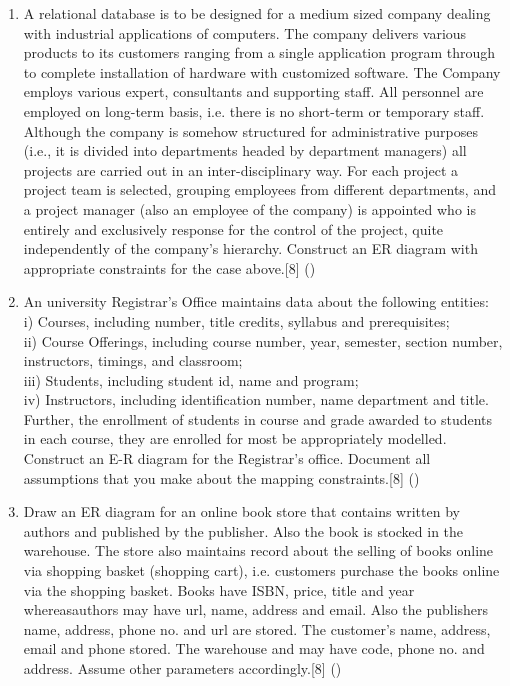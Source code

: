 \documentclass[12pt]{article}
\begin{document}
\begin{enumerate}
    \item A relational database is to be designed for a medium sized company dealing with industrial applications of computers. The company delivers various products to its customers ranging from a single application program through to complete installation of hardware with customized software. The Company employs various expert, consultants and supporting staff. All personnel are employed on long-term basis, i.e. there is no short-term or temporary staff. Although the company is somehow structured for administrative purposes (i.e., it is divided into departments headed by department managers) all projects are carried out in an inter-disciplinary way. For each project a project team is selected, grouping employees from different departments, and a project manager (also an employee of the company) is appointed who is entirely and exclusively response for the control of the project, quite independently of the company's hierarchy. Construct an ER diagram with appropriate constraints for the case above.\hfill[8] ()

    \item An university Registrar's Office maintains data about the following entities:\\
    i) Courses, including number, title credits, syllabus and prerequisites;\\
    ii) Course Offerings, including course number, year, semester, section number, instructors, timings, and classroom;\\
    iii) Students, including student id, name and program;\\
    iv) Instructors, including identification number, name department and title.\\
    Further, the enrollment of students in course and grade awarded to students in each course, they are enrolled for most be appropriately modelled. Construct an E-R diagram for the Registrar's office. Document all assumptions that you make about the mapping constraints.\hfill[8] ()

    \item Draw an ER diagram for an online book store that contains written by authors and published by the publisher. Also the book is stocked in the warehouse. The store also maintains record about the selling of books online via shopping basket (shopping cart), i.e. customers purchase the books online via the shopping basket. Books have ISBN, price, title and year whereasauthors may have url, name, address and email. Also the publishers name, address, phone no. and url are stored. The customer's name, address, email and phone stored. The warehouse and may have code, phone no. and address. Assume other parameters accordingly.\hfill[8] ()


\end{enumerate}
\end{document}

